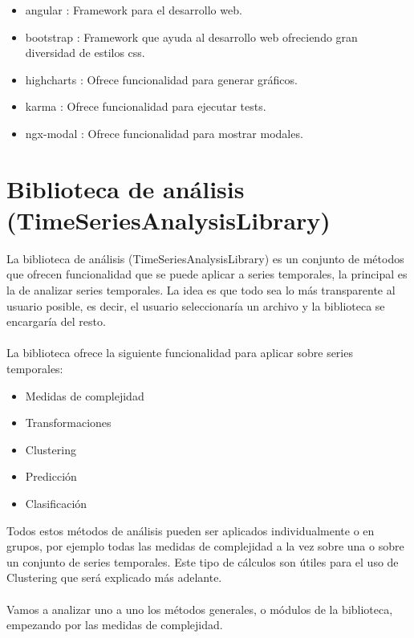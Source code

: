 \documentclass[14pt]{extarticle}
\theoremstyle{definition}
\theoremstyle{remark}
\begin{document}
\begin{itemize}
	\item angular \citep{web:angular_google}: Framework para el desarrollo web.
	\item bootstrap \citep{web:bootstrap}: Framework que ayuda al desarrollo web ofreciendo gran diversidad de estilos css.
	\item highcharts \citep{web:highcharts}: Ofrece funcionalidad para generar gráficos.
	\item karma \citep{web:karma}: Ofrece funcionalidad para ejecutar tests.
	\item ngx-modal \citep{web:ngx-modal}: Ofrece funcionalidad para mostrar modales.
\end{itemize}

\newpage
\section{Biblioteca de análisis (TimeSeriesAnalysisLibrary)}\label{sec:bibliotecadeanalisis}
La biblioteca de análisis (TimeSeriesAnalysisLibrary) es un conjunto de métodos que ofrecen funcionalidad que se puede aplicar a series temporales, la principal es la de analizar series temporales. La idea es que todo sea lo más transparente al usuario posible, es decir, el usuario seleccionaría un archivo y la biblioteca se encargaría del resto.\\\\La biblioteca ofrece la siguiente funcionalidad para aplicar sobre series temporales:
\begin{itemize}
	\item Medidas de complejidad
	\item Transformaciones
	\item Clustering
	\item Predicción
	\item Clasificación
\end{itemize}
Todos estos métodos de análisis pueden ser aplicados individualmente o en grupos, por ejemplo todas las medidas de complejidad a la vez sobre una o sobre un conjunto de series temporales. Este tipo de cálculos son útiles para el uso de Clustering que será explicado más adelante.\\\\Vamos a analizar uno a uno los métodos generales, o módulos de la biblioteca, empezando por las medidas de complejidad.
\end{document}
